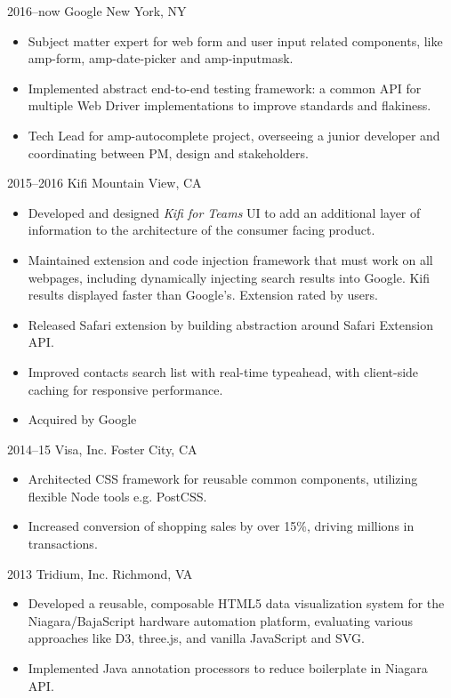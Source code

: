 \documentclass[]{cv-style}          %
\begin{document}
\begin{entrylist}

\entry
  {2016--now}
  {Google}
  {New York, NY}
  {
  \begin{itemize}
    \item Subject matter expert for web form and user input related components, like amp-form, amp-date-picker and amp-inputmask.
    \item Implemented abstract end-to-end testing framework: a common API for multiple Web Driver implementations to improve standards and flakiness.
    \item Tech Lead for amp-autocomplete project, overseeing a junior developer and coordinating between PM, design and stakeholders.
  \end{itemize}}
\entry
  {2015--2016}
  {Kifi}
  {Mountain View, CA}
  {
  \begin{itemize}
    \item Developed and designed \textit{Kifi for Teams} UI to add an additional layer of information to the architecture of the consumer facing product.
    \item Maintained extension and code injection framework that must work on all webpages, including dynamically injecting search results into Google. Kifi results displayed faster than Google's. Extension rated by users.
    \item Released Safari extension by building abstraction around Safari Extension API.
    \item Improved contacts search list with real-time typeahead, with client-side caching for responsive performance.
    \item Acquired by Google
  \end{itemize}}
\entry
  {2014--15}
  {Visa, Inc.}
  {Foster City, CA}
  {
  \begin{itemize}
    \item Architected CSS framework for reusable common components, utilizing flexible Node tools e.g. PostCSS.
    \item Increased conversion of shopping sales by over 15\%, driving millions in transactions.
  \end{itemize}}
\entry
  {2013}
  {Tridium, Inc.}
  {Richmond, VA}
  {
  \begin{itemize}
    \item Developed a reusable, composable HTML5 data visualization system for the Niagara/BajaScript hardware automation platform, evaluating various approaches like D3, three.js, and vanilla JavaScript and SVG.
    \item Implemented Java annotation processors to reduce boilerplate in Niagara API.
  \end{itemize}}
\end{entrylist}
\end{document}
